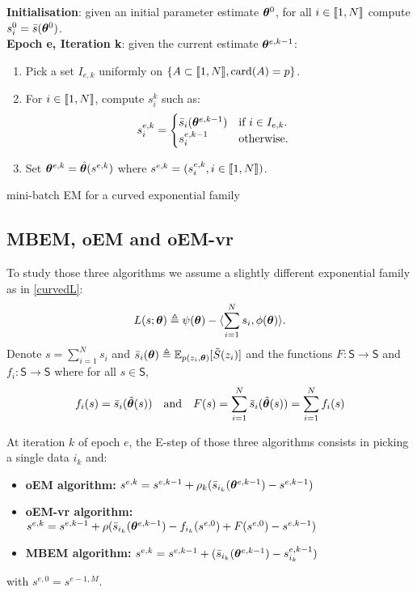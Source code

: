 \begin{algorithm}[H]
\textbf{Initialisation}: given an initial parameter estimate $\bm{\theta}^0$, for all $i \in \llbracket1,N\rrbracket$ compute $s^0_i = \bar{s}(\bm{\theta}^0)$.\\
\textbf{Epoch e, Iteration k}: given the current estimate $\bm{\theta}^{e,k-1}$:
\begin{enumerate}
\item Pick a set $I_{e,k}$ uniformly on $\{A \subset \llbracket1,N\rrbracket, \operatorname{card}(A)=p\}$.
\item For $i \in \llbracket1,N\rrbracket$, compute $s^k_{i}$ such as:
\begin{align}
 s^{e,k}_i &=
  \begin{cases}
   \bar{s}_i(\bm{\theta}^{e,k-1})    & \text{if } i \in I_{e,k}.\\
   s^{e,k-1}_i                               & \text{otherwise}.
  \end{cases}
\end{align}

\item Set $\bm{\theta}^{e,k} = \hat{\bm{\theta}}(s^{e,k})$ where $s^{e,k} = (s^{e,k}_i, i \in \llbracket1,N\rrbracket)$.

\end{enumerate}
\caption{mini-batch EM for a curved exponential family}
\label{alg:mbem-expo}
\end{algorithm}

\subsection{MBEM, oEM and oEM-vr}
To study those three algorithms we assume a slightly different exponential family as in \eqref{curvedL}:
\begin{equation}\label{curvedL}
L(s;\bm{\theta}) \triangleq \psi(\bm{\theta}) - \langle \sum_{i=1}^N{s_i}, \phi(\bm{\theta})\rangle.
\end{equation}
Denote $s = \sum_{i=1}^N{s_i}$ and $\bar{s}_i(\bm{\theta}) \triangleq \operatorname*{\mathbb{E}}_{p(z_i, \bm{\theta})}[\tilde{S}(z_i)]$ and the functions $F: \mathsf{S} \to \mathsf{S}$ and $f_i: \mathsf{S} \to \mathsf{S}$ where for all $s \in  \mathsf{S}$, 
$$f_i(s) = \bar{s}_i (\hat{\bm{\theta}}(s)) \quad \textrm{and} \quad F(s) = \sum_{i=1}^N \bar{s}_i (\hat{\bm{\theta}}(s)) = \sum_{i=1}^N f_i (s)$$

At iteration $k$ of epoch $e$, the E-step of those three algorithms consists in picking a single data $i_k$ and:
\begin{itemize}
\item \textbf{oEM algorithm:}  $s^{e,k} = s^{e,k-1} + \rho_k ( \bar{s}_{i_k}(\bm{\theta}^{e,k-1})  - s^{e,k-1} )$
\item \textbf{oEM-vr algorithm: }  $s^{e,k} = s^{e,k-1} + \rho ( \bar{s}_{i_k}(\bm{\theta}^{e,k-1}) - f_{i_k}(s^{e,0})+ F(s^{e,0}) - s^{e,k-1} )$
\item \textbf{MBEM algorithm: }  $s^{e,k} = s^{e,k-1} +  ( \bar{s}_{i_k}(\bm{\theta}^{e,k-1})  - s_{i_k}^{e,k-1} )$
\end{itemize}
with $ s^{e,0}  = s^{e-1,M}$.

